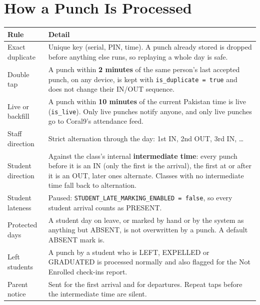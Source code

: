 \documentclass[11pt]{article}
\begin{document}
\section{How a Punch Is Processed}\label{sec:processing}
\begin{longtable}{@{}p{} p{}@{}}
\toprule
\textbf{Rule} & \textbf{Detail} \\
\midrule
\endhead
Exact duplicate & Unique key (serial, PIN, time). A punch already stored is dropped before anything else runs, so
  replaying a whole day is safe. \\
Double tap & A punch within \textbf{2 minutes} of the same person's last accepted punch, on any device, is kept with
  \texttt{is\_duplicate = true} and does not change their IN/OUT sequence. \\
Live or backfill & A punch within \textbf{10 minutes} of the current Pakistan time is live (\texttt{is\_live}). Only live
  punches notify anyone, and only live punches go to Coral9's attendance feed. \\
Staff direction & Strict alternation through the day: 1st IN, 2nd OUT, 3rd IN, \ldots \\
Student direction & Against the class's internal \textbf{intermediate time}: every punch before it is an IN (only the
  first is the arrival), the first at or after it is an OUT, later ones alternate. Classes with no intermediate time
  fall back to alternation. \\
Student lateness & Paused: \texttt{STUDENT\_LATE\_MARKING\_ENABLED = false}, so every student arrival counts as
  PRESENT. \\
Protected days & A student day on leave, or marked by hand or by the system as anything but ABSENT, is not overwritten
  by a punch. A default ABSENT mark is. \\
Left students & A punch by a student who is LEFT, EXPELLED or GRADUATED is processed normally and also flagged for the
  Not Enrolled check-ins report. \\
Parent notice & Sent for the first arrival and for departures. Repeat taps before the intermediate time are silent. \\
\bottomrule
\end{longtable}

\end{document}
